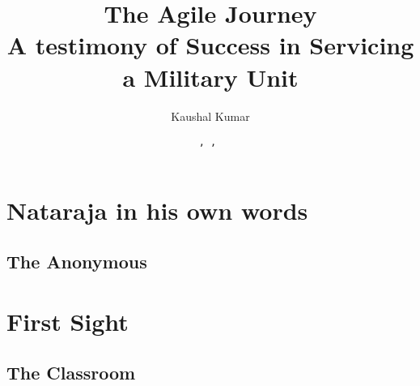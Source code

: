 \documentclass{thesis}
\title{{\Huge{The Agile Journey} \linebreak \linebreak \\ \Large{A testimony of Success in Servicing a Military Unit}}}
\author{\Huge{{Kaushal Kumar}}}
\date{\texttt{\datedayname, \monthname { }\the\day, \the\year} }
\begin{document}
\maketitle
\tableofcontents
\chapter{Nataraja in his own words} \hrulefill
\section{The Anonymous}
\chapter{First Sight} \hrulefill
\section{The Classroom}
\end{document}
